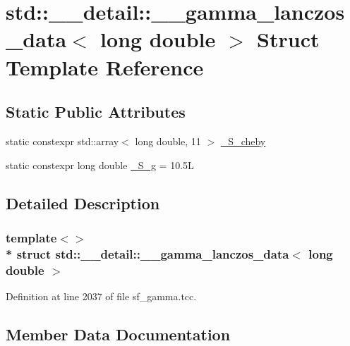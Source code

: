 \hypertarget{structstd_1_1____detail_1_1____gamma__lanczos__data_3_01long_01double_01_4}{}\section{std\+:\+:\+\_\+\+\_\+detail\+:\+:\+\_\+\+\_\+gamma\+\_\+lanczos\+\_\+data$<$ long double $>$ Struct Template Reference}
\label{structstd_1_1____detail_1_1____gamma__lanczos__data_3_01long_01double_01_4}
\subsection*{Static Public Attributes}
\begin{DoxyCompactItemize}
\item 
static constexpr std\+::array$<$ long double, 11 $>$ \hyperlink{structstd_1_1____detail_1_1____gamma__lanczos__data_3_01long_01double_01_4_a7968f4e72045e6a2b09244c678ddf3cc}{\+\_\+\+S\+\_\+cheby}
\item 
static constexpr long double \hyperlink{structstd_1_1____detail_1_1____gamma__lanczos__data_3_01long_01double_01_4_af86428283206e8b9bd3dc5709855c901}{\+\_\+\+S\+\_\+g} = 10.\+5L
\end{DoxyCompactItemize}


\subsection{Detailed Description}
\subsubsection*{template$<$$>$\\*
struct std\+::\+\_\+\+\_\+detail\+::\+\_\+\+\_\+gamma\+\_\+lanczos\+\_\+data$<$ long double $>$}



Definition at line 2037 of file sf\+\_\+gamma.\+tcc.



\subsection{Member Data Documentation}
